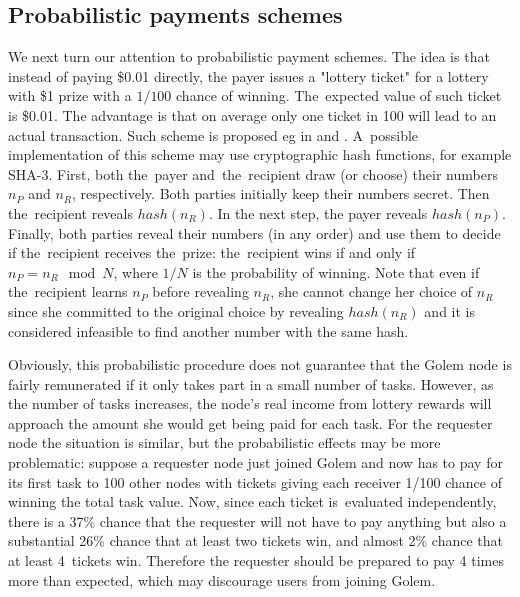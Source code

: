 \documentclass[a4paper]{article}
\begin{document}
\subsection{Probabilistic payments schemes}
    We next turn our attention to probabilistic payment schemes. The idea is that instead of paying \$0.01 directly,
    the payer issues a "lottery ticket" for a lottery with \$1 prize with a $1/100$ chance of winning. The~expected
    value of such ticket is \$0.01. The advantage is that on average only one ticket in 100 will lead to an actual
    transaction. Such scheme is proposed eg in \cite{RIVEST} and \cite{WHEELER}.
    A~possible implementation of this scheme may use cryptographic hash functions, for example SHA-3. First, both
    the~payer and~the~recipient draw (or choose) their numbers $n_P$ and $n_R$, respectively.
    Both parties initially keep their numbers secret. Then the~recipient reveals $hash(n_R)$. In the next step,
    the payer reveals $hash(n_P)$. Finally, both parties reveal their numbers (in any order) and use them to decide
    if the~recipient receives the~prize: the~recipient wins if and only if $n_P = n_R \mod N$, where $1/N$ is
    the probability of winning. Note that even if the~recipient learns $n_P$ before revealing $n_R$, she cannot change
    her choice of $n_R$ since she committed to the original choice by revealing $hash(n_R)$ and it is considered
    infeasible to find another number with the same hash.

    Obviously, this probabilistic procedure does not guarantee that the Golem node is fairly remunerated if it only
    takes part in a small number of tasks. However, as the number of tasks increases, the node's real income from
    lottery rewards will approach the amount she would get being paid for each task. For the requester node the
    situation is similar, but the probabilistic effects may be more problematic: suppose a requester node just
    joined Golem and now has to pay for its first task to 100 other nodes with tickets giving each receiver
    1/100 chance of winning the total task value. Now, since each ticket is~evaluated independently,
    there is a 37\% chance that the requester will not have to pay anything but also a substantial 26\% chance that
    at least two tickets win, and almost 2\% chance that at least 4~tickets win. Therefore the requester should be
    prepared to pay 4 times more than expected, which may discourage users from joining Golem.
\end{document}
